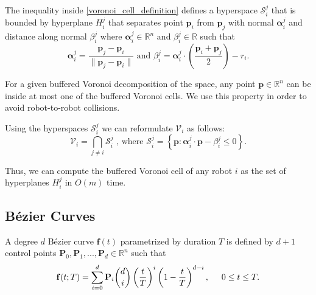 \documentclass{svproc}
\newcommand{\vp}{\mathbf{p}}
\newcommand{\valpha}{\mathbf{\alpha}}
\newcommand{\vP}{\mathbf{P}}
\newcommand{\vf}{\mathbf{f}}
\newcommand{\cV}{\mathcal{V}}
\newcommand{\cS}{\mathcal{S}}
\newcommand{\R}{\mathbb{R}} %
\begin{document}
The inequality inside \eqref{voronoi_cell_definition} defines a hyperspace $\cS_i^j$ that is bounded by hyperplane $H_i^j$ that separates point $\vp_i$ from $\vp_j$ with normal $\valpha_i^j$ and distance along normal $\beta_i^j$ where $\valpha_i^j\in \R^n$ and $\beta_i^j\in \R$ such that
\begin{equation}
    \valpha_i^j = \frac{\vp_j - \vp_i}{\|\vp_j-\vp_i\|} \text{ and }
    \beta_i^j = \valpha_i^j \cdot \left(\frac{\vp_i + \vp_j}{2}\right) - r_i.
    \label{voronoiAlphaBeta}
\end{equation}

For a given buffered Voronoi decomposition of the space, any point $\vp\in \R^n$ can be inside at most one of the buffered Voronoi cells.
We use this property in order to avoid robot-to-robot collisions.

Using the hyperspaces $\cS_i^j$ we can reformulate $\cV_i$ as follows:
\begin{equation}
    \cV_i = \bigcap\limits_{j\neq i} \cS_i^j \text{ , where } \cS_i^j = \left\{\vp : \valpha_i^j \cdot \vp - \beta_i^j \leq 0\right\}.
    \label{voronoiEquation}
\end{equation}



Thus, we can compute the buffered Voronoi cell of any robot $i$ as the set of hyperplanes $H_i^j$ in $O(m)$ time.

\subsection{B\'ezier Curves} \label{bezierCurves}
A degree $d$ B\'ezier curve $\vf(t)$ parametrized by duration $T$ is defined by $d+1$ control points $\vP_0, \vP_1, ..., \vP_d \in \R^n$ such that
\begin{align}
    \vf(t; T) = \sum_{i=0}^d \vP_i {d\choose i}\left(\frac{t}{T}\right)^i\left(1-\frac{t}{T}\right)^{d-i},\hskip .5cm 0\leq t \leq T.
\end{align}
\end{document}
